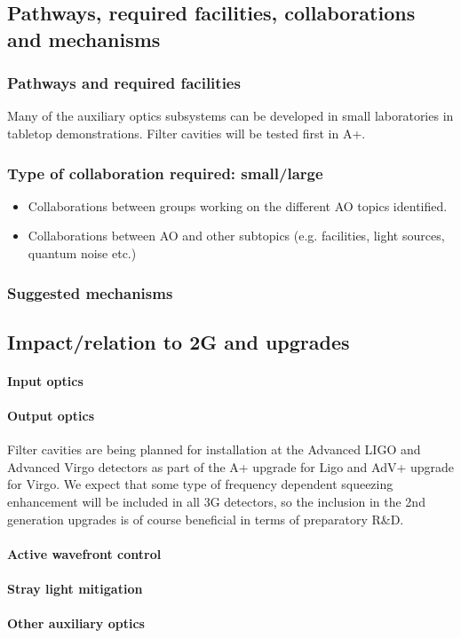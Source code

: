 \subsection{Pathways, required facilities, collaborations and mechanisms}

\subsubsection{Pathways and required facilities}
Many of the auxiliary optics subsystems can be developed in small laboratories in tabletop demonstrations. Filter cavities will be tested first in A+. 

\subsubsection{Type of collaboration required:  small/large}
\begin{itemize}
\item Collaborations between groups working on the different AO topics identified. 
\item Collaborations between AO and other subtopics (e.g. facilities, light sources, quantum noise etc.)
\end{itemize}
\subsubsection{Suggested mechanisms}

\subsection{Impact/relation to 2G and upgrades}
\paragraph{Input optics}


\paragraph{Output optics}
Filter cavities are being planned for installation at the Advanced LIGO and Advanced Virgo detectors as part of the A+ upgrade for Ligo and AdV+ upgrade for Virgo. We expect that some type of frequency dependent squeezing enhancement will be included in all 3G detectors, so the inclusion in the 2nd generation upgrades is of course beneficial in terms of preparatory R\&D.

\paragraph{Active wavefront control}
\paragraph{Stray light mitigation}
\paragraph{Other auxiliary optics}